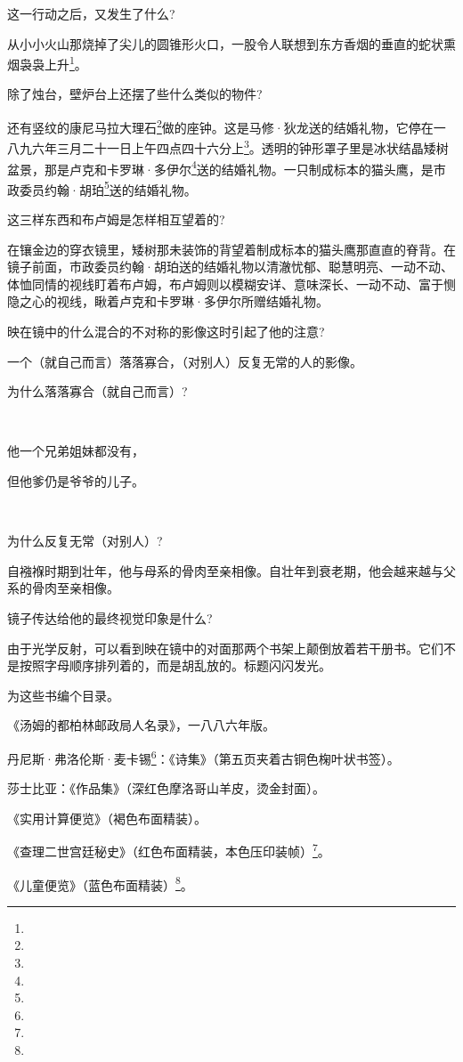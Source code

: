 \par 这一行动之后，又发生了什么?
\par 从小小火山那烧掉了尖儿的圆锥形火口，一股令人联想到东方香烟的垂直的蛇状熏烟袅袅上升\footnote{}。
\par 除了烛台，壁炉台上还摆了些什么类似的物件?
\par 还有竖纹的康尼马拉大理石\footnote{}做的座钟。这是马修·狄龙送的结婚礼物，它停在一八九六年三月二十一日上午四点四十六分上\footnote{}。透明的钟形罩子里是冰状结晶矮树盆景，那是卢克和卡罗琳·多伊尔\footnote{}送的结婚礼物。一只制成标本的猫头鹰，是市政委员约翰·胡珀\footnote{}送的结婚礼物。
\par 这三样东西和布卢姆是怎样相互望着的?
\par 在镶金边的穿衣镜里，矮树那未装饰的背望着制成标本的猫头鹰那直直的脊背。在镜子前面，市政委员约翰·胡珀送的结婚礼物以清澈忧郁、聪慧明亮、一动不动、体恤同情的视线盯着布卢姆，布卢姆则以模糊安详、意味深长、一动不动、富于恻隐之心的视线，瞅着卢克和卡罗琳·多伊尔所赠结婚礼物。
\par 映在镜中的什么混合的不对称的影像这时引起了他的注意?
\par 一个（就自己而言）落落寡合，（对别人）反复无常的人的影像。
\par 为什么落落寡合（就自己而言）?
\par  
\par 他一个兄弟姐妹都没有，
\par 但他爹仍是爷爷的儿子。
\par  
\par 为什么反复无常（对别人）?
\par 自襁褓时期到壮年，他与母系的骨肉至亲相像。自壮年到衰老期，他会越来越与父系的骨肉至亲相像。
\par 镜子传达给他的最终视觉印象是什么?
\par 由于光学反射，可以看到映在镜中的对面那两个书架上颠倒放着若干册书。它们不是按照字母顺序排列着的，而是胡乱放的。标题闪闪发光。
\par 为这些书编个目录。
\par 《汤姆的都柏林邮政局人名录》，一八八六年版。
\par 丹尼斯·弗洛伦斯·麦卡锡\footnote{}：《诗集》（第五页夹着古铜色椈叶状书签）。
\par 莎士比亚：《作品集》（深红色摩洛哥山羊皮，烫金封面）。
\par 《实用计算便览》（褐色布面精装）。
\par 《查理二世宫廷秘史》（红色布面精装，本色压印装帧）\footnote{}。
\par 《儿童便览》（蓝色布面精装）\footnote{}。
